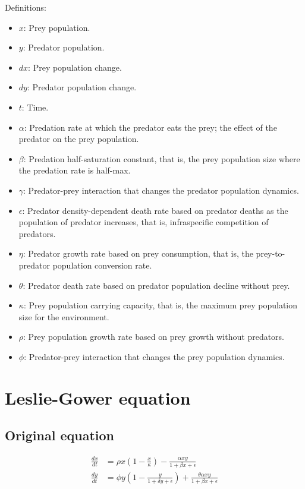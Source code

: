 Definitions:
\begin{itemize}
\item $x$: Prey population.
\item $y$: Predator population.
\item $dx$: Prey population change.
\item $dy$: Predator population change.
\item $t$: Time.
\item $\alpha$: Predation rate at which the predator eats the prey; the effect of the predator on the prey population.
\item $\beta$: Predation half-saturation constant, that is, the prey population size where the predation rate is half-max.
\item $\gamma$: Predator-prey interaction that changes the predator population dynamics.
\item $\epsilon$: Predator density-dependent death rate based on predator deaths as the population of predator increases, that is, infraspecific competition of predators.
\item $\eta$: Predator growth rate based on prey consumption, that is, the prey-to-predator population conversion rate.
\item $\theta$: Predator death rate based on predator population decline without prey.
\item $\kappa$: Prey population carrying capacity, that is, the maximum prey population size for the environment.
\item $\rho$: Prey population growth rate based on prey growth without predators.
\item $\phi$: Predator-prey interaction that changes the prey population dynamics.
\end{itemize}

\section{Leslie-Gower equation}
\subsection{Original equation}
\begin{align*}
\frac{dx}{dt} &= \rho x (1 - \frac{x}{\kappa}) - \frac{\alpha xy}{1 + \beta x + \epsilon} \\
\frac{dy}{dt} &= \phi y (1 - \frac{y}{1 + \delta y + \epsilon}) + \frac{\theta \alpha xy}{1 + \beta x + \epsilon}
\end{align*}

